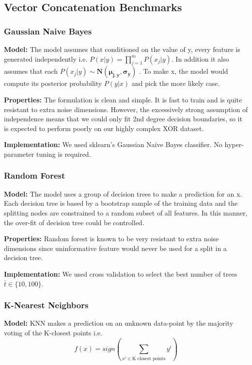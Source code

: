 \documentclass{article}
\begin{document}
\subsection*{Vector Concatenation Benchmarks}

\subsubsection*{Gaussian Naive Bayes}
\textbf{Model:}
The model assumes that conditioned on the value of y, every feature  is generated independently i.e. $P(x|y) = \prod_{j=1}^{m} P(x_j|y)$. In addition it also assumes that each $P(x_j|y) \sim \mathbf{N(\mu_{j,y}, \sigma_y)}$ . To make x, the model would compute its posterior probability $P(y|x)$ and pick the more likely case.

\textbf{Properties:}
The formulation is clean and simple. It is fast to train and is quite resistant to extra noise dimensions.
However, the excessively strong assumption of independence means that we could only fit 2nd degree decision boundaries, so it is expected to perform poorly on our highly complex XOR dataset.

\textbf{Implementation:}
We used sklearn's Gaussian Naive Bayes classifier. No hyper-parameter tuning is required.

\subsubsection*{Random Forest}
\textbf{Model:}
The model uses a group of decision trees to make a prediction for an x. Each decision tree is based by a bootstrap sample of the training data and the splitting nodes are constrained to a random subset of all features. In this manner, the over-fit of decision tree could be controlled.

\textbf{Properties:}
Random forest is known to be very resistant to extra noise dimensions since uninformative feature would never be used for a split in a decision tree.

\textbf{Implementation:}
We used cross validation to select the best number of trees $\bar{t} \in \{10, 100\}$.

\subsubsection*{K-Nearest Neighbors}
\textbf{Model:}
KNN makes a prediction on an unknown data-point by the majority voting of the K-closest points i.e. $$f(x) = sign(\sum_{x^i \in \text{K closest points}} y^i) $$
\end{document}
